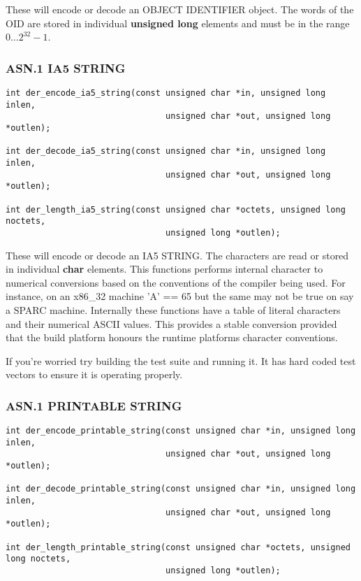 \documentclass[a4paper]{book}
\begin{document}
These will encode or decode an OBJECT IDENTIFIER object.  The words of the OID are stored in individual \textbf{unsigned long} elements and must be in the range
$0 \ldots 2^{32} - 1$.  

\subsubsection{ASN.1 IA5 STRING}

\begin{verbatim}
int der_encode_ia5_string(const unsigned char *in, unsigned long inlen,
                                unsigned char *out, unsigned long *outlen);

int der_decode_ia5_string(const unsigned char *in, unsigned long inlen,
                                unsigned char *out, unsigned long *outlen);

int der_length_ia5_string(const unsigned char *octets, unsigned long noctets, 
                                unsigned long *outlen);
\end{verbatim}

These will encode or decode an IA5 STRING.  The characters are read or stored in individual \textbf{char} elements.  This functions performs internal character
to numerical conversions based on the conventions of the compiler being used.  For instance, on an x86\_32 machine 'A' == 65 but the same may not be true on 
say a SPARC machine.  Internally these functions have a table of literal characters and their numerical ASCII values.  This provides a stable conversion provided
that the build platform honours the runtime platforms character conventions.

If you're worried try building the test suite and running it.  It has hard coded test vectors to ensure it is operating properly. 

\subsubsection{ASN.1 PRINTABLE STRING}

\begin{verbatim}
int der_encode_printable_string(const unsigned char *in, unsigned long inlen,
                                unsigned char *out, unsigned long *outlen);

int der_decode_printable_string(const unsigned char *in, unsigned long inlen,
                                unsigned char *out, unsigned long *outlen);

int der_length_printable_string(const unsigned char *octets, unsigned long noctets, 
                                unsigned long *outlen);
\end{verbatim}
\end{document}
